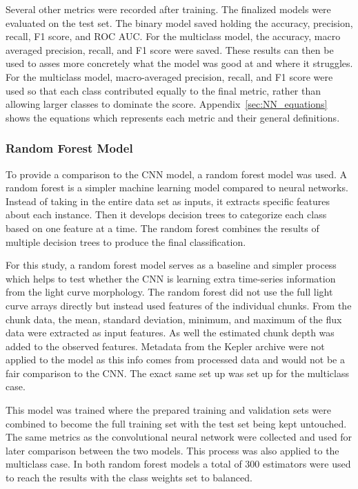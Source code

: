 Several other metrics were recorded after training. The finalized models were evaluated on the test set. The binary model saved holding the accuracy, precision, recall, F1 score, and ROC AUC. For the multiclass model, the accuracy, macro averaged precision, recall, and F1 score were saved. These results can then be used to asses more concretely what the model was good at and where it struggles. For the multiclass model, macro-averaged precision, recall, and F1 score were used so that each class contributed equally to the final metric, rather than allowing larger classes to dominate the score. Appendix~\ref{sec:NN_equations} shows the equations which represents each metric and their general definitions.

\subsubsection{Random Forest Model}

To provide a comparison to the CNN model, a random forest model was used. A random forest is a simpler machine learning model compared to neural networks. Instead of taking in the entire data set as inputs, it extracts specific features about each instance. Then it develops decision trees to categorize each class based on one feature at a time. The random forest combines the results of multiple decision trees to produce the final classification. 

For this study, a random forest model serves as a baseline and simpler process which helps to test whether the CNN is learning extra time-series information from the light curve morphology. The random forest did not use the full light curve arrays directly but instead used features of the individual chunks. From the chunk data, the mean, standard deviation, minimum, and maximum of the flux data were extracted as input features. As well the estimated chunk depth was added to the observed features. Metadata from the Kepler archive were not applied to the model as this info comes from processed data and would not be a fair comparison to the CNN. The exact same set up was set up for the multiclass case.

This model was trained where the prepared training and validation sets were combined to become the full training set with the test set being kept untouched. The same metrics as the convolutional neural network were collected and used for later comparison between the two models. This process was also applied to the multiclass case. In both random forest models a total of 300 estimators were used to reach the results with the class weights set to balanced.

